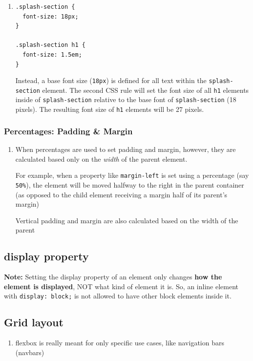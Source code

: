 \documentclass[a4paper, 12pt]{article}
\begin{document}
\begin{enumerate}
\item \begin{verbatim}
.splash-section {
  font-size: 18px;
}

.splash-section h1 {
  font-size: 1.5em;
}
\end{verbatim}
Instead, a base font size (\verb|18px|) is defined for all text within the \verb|splash-section| element. The second CSS rule will set the font size of all \verb|h1| elements inside of \verb|splash-section| relative to the base font of \verb|splash-section| (18 pixels). The resulting font size of \verb|h1| elements will be 27 pixels.
\end{enumerate}

\subsubsection{Percentages: Padding \& Margin}
\begin{enumerate}
\item When percentages are used to set padding and margin, however, they are calculated based only on the \textit{width} of the parent element.

For example, when a property like \verb|margin-left| is set using a percentage (say \verb|50%|), the element will be moved halfway to the right in the parent container (as opposed to the child element receiving a margin half of its parent's margin)

Vertical padding and margin are also calculated based on the width of the parent

\end{enumerate}

\subsection{display property}
\textbf{Note:} Setting the display property of an element only changes \textbf{how the element is displayed}, NOT what kind of element it is. So, an inline element with \verb|display: block;| is not allowed to have other block elements inside it.

\subsection{Grid layout}
\begin{enumerate}
\item flexbox is really meant for only specific use cases, like navigation bars (navbars)
\end{enumerate}
\end{document}
